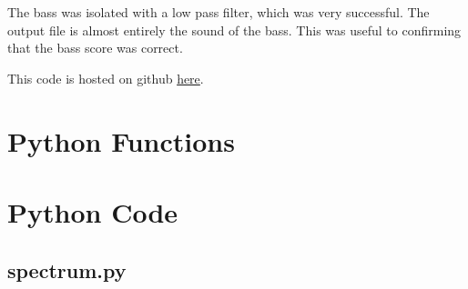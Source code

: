 \documentclass{article}
\begin{document}
    The bass was isolated with a low pass filter, which was very successful. The output file is almost entirely the sound of the bass. This was useful to confirming that the bass score was correct.

    
    
    \FloatBarrier
    \newpage
    \appendix
    This code is hosted on github \href{https://github.com/bagriffith/AMATH582/tree/main/HW2}{here}.
    \section{Python Functions}
    
    \section{Python Code}
    \subsection{spectrum.py}
    \inputminted{python}{../code/spectrum.py}
\end{document}
